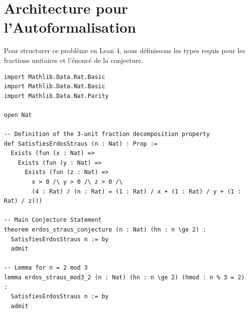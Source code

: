 \documentclass[12pt, a4paper]{article}
\begin{document}
\section{Architecture pour l'Autoformalisation}

Pour structurer ce probl\`eme en Lean 4, nous d\'efinissons les types requis pour les fractions unitaires et l'\'enonc\'e de la conjecture.

\begin{lstlisting}[language=lean, basicstyle=\ttfamily\small, breaklines=true]
import Mathlib.Data.Rat.Basic
import Mathlib.Data.Nat.Basic
import Mathlib.Data.Nat.Parity

open Nat

-- Definition of the 3-unit fraction decomposition property
def SatisfiesErdosStraus (n : Nat) : Prop :=
  Exists (fun (x : Nat) =>
    Exists (fun (y : Nat) =>
      Exists (fun (z : Nat) =>
        x > 0 /\ y > 0 /\ z > 0 /\
        (4 : Rat) / (n : Rat) = (1 : Rat) / x + (1 : Rat) / y + (1 : Rat) / z)))

-- Main Conjecture Statement
theorem erdos_straus_conjecture (n : Nat) (hn : n \ge 2) :
  SatisfiesErdosStraus n := by
  admit

-- Lemma for n = 2 mod 3
lemma erdos_straus_mod3_2 (n : Nat) (hn : n \ge 2) (hmod : n % 3 = 2) :
  SatisfiesErdosStraus n := by
  admit
\end{lstlisting}
\end{document}
